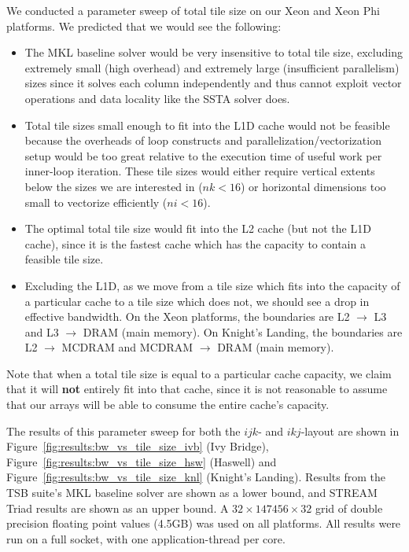 \documentclass[10pt, conference, compsocconf]{IEEEtran}
\begin{document}
We conducted a parameter sweep of total tile size on our Xeon and Xeon Phi 
  platforms.
We predicted that we would see the following: 
\begin{itemize}
\item The MKL baseline solver would be very insensitive to total tile size,
  excluding extremely small (high overhead) and extremely large (insufficient
  parallelism) sizes since it solves each column independently and thus cannot
  exploit vector operations and data locality like the SSTA solver does.
\item Total tile sizes small enough to fit into the L1D cache would not be
  feasible because the overheads of loop constructs and
  parallelization/vectorization setup would be too great relative to the
  execution time of useful work per inner-loop iteration.
These tile sizes would either require vertical extents below the sizes 
  we are interested in (\(nk < 16\)) or horizontal
  dimensions too small to vectorize efficiently (\(ni < 16\)).
\item The optimal total tile size would fit into the L2 cache (but not the L1D
  cache), since it is the fastest cache which has the capacity to contain a
  feasible tile size.
\item Excluding the L1D, as we move from a tile size which fits into the
  capacity of a particular cache to a tile size which does not, we should see a
  drop in effective bandwidth.
On the Xeon platforms, the boundaries are L2 \(\rightarrow\) L3 and L3
  \(\rightarrow\) DRAM (main memory).
On Knight's Landing, the boundaries are L2 \(\rightarrow\) MCDRAM and MCDRAM
  \(\rightarrow\) DRAM (main memory).
\end{itemize}
Note that when a total tile size is equal to a particular cache capacity, we
  claim that it will \textbf{not} entirely fit into that cache, since it is not
  reasonable to assume that our arrays will be able to consume the entire cache's
  capacity.

The results of this parameter sweep for both the \(ijk\)- and \(ikj\)-layout are
  shown in Figure~\ref{fig:results:bw_vs_tile_size_ivb} (Ivy Bridge),
  Figure~\ref{fig:results:bw_vs_tile_size_hsw} (Haswell) and
  Figure~\ref{fig:results:bw_vs_tile_size_knl} (Knight's Landing).
Results from the TSB suite's MKL baseline solver are shown as a lower bound,
  and STREAM Triad results are shown as an upper bound. 
A \(32 \times 147456 \times 32\) grid of double precision floating point values
  (4.5GB) was used on all platforms.
All results were run on a full socket, with one application-thread per core.
\end{document}
